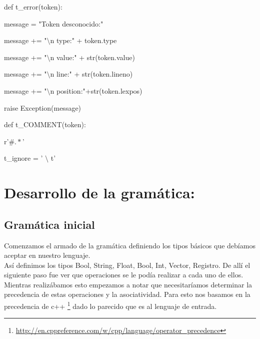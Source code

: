 \begin{multicols}{2}

def t\_error(token):

 \hspace{2mm}message = "Token desconocido:"
    
\hspace{2mm}message += "$\setminus$n type:" + token.type
    
\hspace{2mm}message += "$\setminus$n value:" + str(token.value)
    
\hspace{2mm}message += "$\setminus$n line:" + str(token.lineno)
    
\hspace{2mm}message += "$\setminus$n position:"+str(token.lexpos)
    
\hspace{2mm}raise Exception(message)
  

\columnbreak

def t\_COMMENT(token):

\hspace{2mm}    r'$\#.*$'

t\_ignore  = ' $\setminus$ t'

\end{multicols}




\section{Desarrollo de la gramática:}

\subsection{Gramática inicial}
Comenzamos el armado de la gramática definiendo los tipos básicos que debíamos aceptar en nuestro lenguaje.
\\
Así definimos los tipos Bool, String, Float, Bool, Int, Vector, Registro. De allí el siguiente paso fue ver que operaciones se le podía realizar a cada uno de ellos.
\\
Mientras realizábamos esto empezamos a notar que necesitaríamos determinar la precedencia de estas operaciones y la asociatividad. Para esto nos basamos en la precedencia de c++ \footnote{\url{http://en.cppreference.com/w/cpp/language/operator_precedence}} dado lo parecido que es al lenguaje de entrada.
\\

